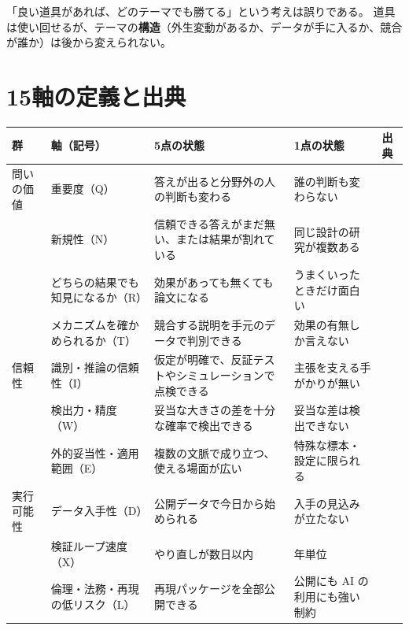 \documentclass[a4paper,10pt]{ltjsarticle}
\begin{document}
\begin{pitfall}
「良い道具があれば、どのテーマでも勝てる」という考えは誤りである。
道具は使い回せるが、テーマの\textbf{構造}（外生変動があるか、データが手に入るか、競合が誰か）は後から変えられない。
\end{pitfall}

\section{15軸の定義と出典}\label{sec:th-axes}

\begin{table}[htbp]
\centering\footnotesize
\begin{tabularx}{\linewidth}{llXXp{3.4cm}}
\toprule
群 & 軸（記号） & 5点の状態 & 1点の状態 & 出典 \\
\midrule
問いの価値 & 重要度（Q） & 答えが出ると分野外の人の判断も変わる & 誰の判断も変わらない & \cite{heilmeier,hamming1986,berk2017} \\
 & 新規性（N） & 信頼できる答えがまだ無い、または結果が割れている & 同じ設計の研究が複数ある & \cite{heilmeier,berk2017,si2024} \\
 & どちらの結果でも知見になるか（R） & 効果があっても無くても論文になる & うまくいったときだけ面白い & \cite{abadie2020,brodeur2020,jdeprr} \\
 & メカニズムを確かめられるか（T） & 競合する説明を手元のデータで判別できる & 効果の有無しか言えない & \cite{deaton2010,low2017,li2026} \\
\midrule
信頼性 & 識別・推論の信頼性（I） & 仮定が明確で、反証テストやシミュレーションで点検できる & 主張を支える手がかりが無い & \cite{angrist2010,keane2010,morris2019} \\
 & 検出力・精度（W） & 妥当な大きさの差を十分な確率で検出できる & 妥当な差は検出できない & \cite{ioannidis2017} \\
 & 外的妥当性・適用範囲（E） & 複数の文脈で成り立つ、使える場面が広い & 特殊な標本・設定に限られる & \cite{deaton2010} \\
\midrule
実行可能性 & データ入手性（D） & 公開データで今日から始められる & 入手の見込みが立たない & \cite{vilhuber2020,zhu2026} \\
 & 検証ループ速度（X） & やり直しが数日以内 & 年単位 & \cite{heilmeier,indxlab} \\
 & 倫理・法務・再現の低リスク（L） & 再現パッケージを全部公開できる & 公開にも AI の利用にも強い制約 & \cite{aeacode,aeadata,christensen2018} \\

\end{tabularx}
\end{table}
\end{document}
